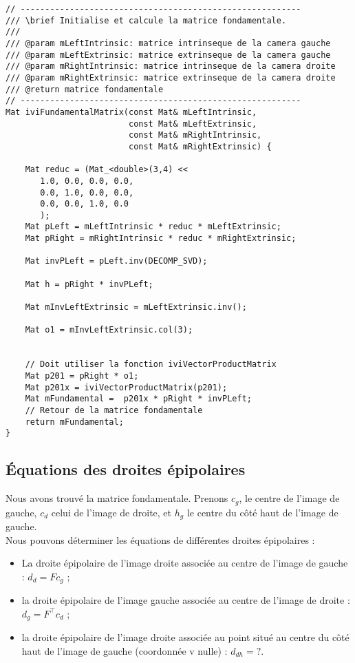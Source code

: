 \documentclass[a4paper]{article}
\begin{document}
\begin{lstlisting}
// ---------------------------------------------------------
/// \brief Initialise et calcule la matrice fondamentale.
///
/// @param mLeftIntrinsic: matrice intrinseque de la camera gauche
/// @param mLeftExtrinsic: matrice extrinseque de la camera gauche
/// @param mRightIntrinsic: matrice intrinseque de la camera droite
/// @param mRightExtrinsic: matrice extrinseque de la camera droite
/// @return matrice fondamentale
// ---------------------------------------------------------
Mat iviFundamentalMatrix(const Mat& mLeftIntrinsic,
                         const Mat& mLeftExtrinsic,
                         const Mat& mRightIntrinsic,
                         const Mat& mRightExtrinsic) {

    Mat reduc = (Mat_<double>(3,4) <<
       1.0, 0.0, 0.0, 0.0,
       0.0, 1.0, 0.0, 0.0,
       0.0, 0.0, 1.0, 0.0
       );
    Mat pLeft = mLeftIntrinsic * reduc * mLeftExtrinsic;
    Mat pRight = mRightIntrinsic * reduc * mRightExtrinsic;

    Mat invPLeft = pLeft.inv(DECOMP_SVD);

    Mat h = pRight * invPLeft;

    Mat mInvLeftExtrinsic = mLeftExtrinsic.inv();

    Mat o1 = mInvLeftExtrinsic.col(3);


    // Doit utiliser la fonction iviVectorProductMatrix
    Mat p201 = pRight * o1;
    Mat p201x = iviVectorProductMatrix(p201);
    Mat mFundamental =  p201x * pRight * invPLeft;
    // Retour de la matrice fondamentale
    return mFundamental;
}
\end{lstlisting}

\subsection{Équations des droites épipolaires}

Nous avons trouvé la matrice fondamentale. Prenons $c_g$, le centre de l'image de gauche, $c_d$ celui de l'image de droite, et $h_g$ le centre du côté haut de l'image de gauche.\\
Nous pouvons déterminer les équations de différentes droites épipolaires :

\begin{itemize}
  \item La droite épipolaire de l'image droite associée au centre de l'image de gauche : $d_d = Fc_g$ ;
  \item la droite épipolaire de l'image gauche associée au centre de l'image de droite : $d_g = F^\top c_d$ ;
  \item la droite épipolaire de l'image droite associée au point situé au centre du côté haut de l'image de gauche (coordonnée v nulle) : $d_{dh} = ?$.
\end{itemize}
\clearpage
\end{document}
